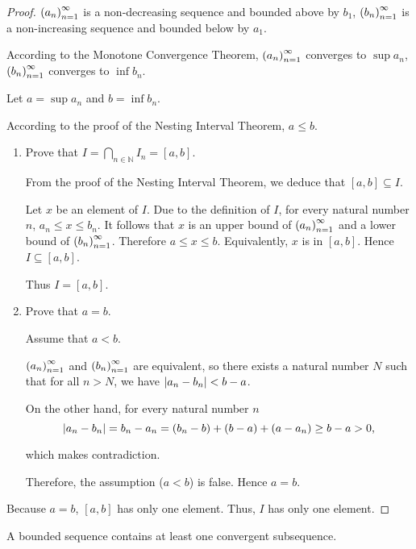 \begin{proof}
    ${\left({a_{n}}\right)}^{\infty}_{n=1}$ is a non-decreasing sequence and bounded above by $b_{1}$, ${\left({b_{n}}\right)}^{\infty}_{n=1}$ is a non-increasing sequence and bounded below by $a_{1}$.

    According to the Monotone Convergence Theorem, ${\left({a_{n}}\right)}^{\infty}_{n=1}$ converges to $\sup{a_{n}}$, ${\left({b_{n}}\right)}^{\infty}_{n=1}$ converges to $\inf{b_{n}}$.

    Let $a = \sup{a_{n}}$ and $b = \inf{b_{n}}$.

    According to the proof of the Nesting Interval Theorem, $a\le b$.

    \begin{enumerate}[label={\textbf{Step \arabic*.}},itemindent=0.5cm]
        \item Prove that $I = \bigcap\limits_{n\in\mathbb{N}} {I_{n}} = [a, b]$.

              From the proof of the Nesting Interval Theorem, we deduce that $[a, b]\subseteq I$.

              Let $x$ be an element of $I$. Due to the definition of $I$, for every natural number $n$, $a_{n} \le x \le b_{n}$. It follows that $x$ is an upper bound of ${\left({a_{n}}\right)}^{\infty}_{n=1}$ and a lower bound of ${\left({b_{n}}\right)}^{\infty}_{n=1}$. Therefore $a \le x \le b$. Equivalently, $x$ is in $[a, b]$. Hence $I\subseteq [a, b]$.

              Thus $I = [a, b]$.
        \item Prove that $a = b$.

              Assume that $a < b$.

              ${\left({a_{n}}\right)}^{\infty}_{n=1}$ and ${\left({b_{n}}\right)}^{\infty}_{n=1}$ are equivalent, so there exists a natural number $N$ such that for all $n > N$, we have $\left\vert{a_{n} - b_{n}}\right\vert < b - a$.

              On the other hand, for every natural number $n$
              \[
                  \left\vert{a_{n} - b_{n}}\right\vert = b_{n} - a_{n} = (b_{n} - b) + (b - a) + (a - a_{n}) \ge b - a > 0,
              \]

              which makes contradiction.

              Therefore, the assumption ($a < b$) is false. Hence $a = b$.
    \end{enumerate}

    Because $a = b$, $[a, b]$ has only one element. Thus, $I$ has only one element.
\end{proof}

\begin{theorem}
    A bounded sequence contains at least one convergent subsequence.
\end{theorem}

